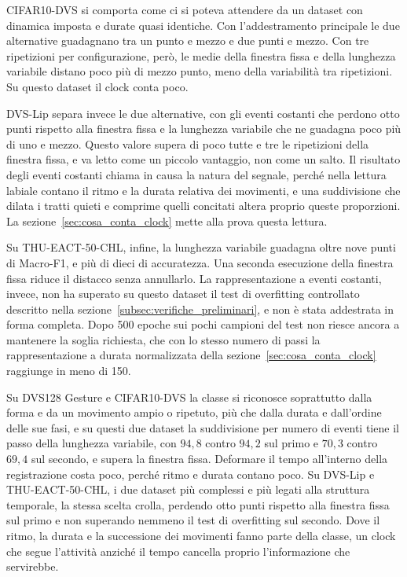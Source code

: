 CIFAR10-DVS si comporta come ci si poteva attendere da un dataset con dinamica imposta e durate quasi identiche. Con l'addestramento principale le due alternative guadagnano tra un punto e mezzo e due punti e mezzo. Con tre ripetizioni per configurazione, però, le medie della finestra fissa e della lunghezza variabile distano poco più di mezzo punto, meno della variabilità tra ripetizioni. Su questo dataset il clock conta poco.

DVS-Lip separa invece le due alternative, con gli eventi costanti che perdono otto punti rispetto alla finestra fissa e la lunghezza variabile che ne guadagna poco più di uno e mezzo. Questo valore supera di poco tutte e tre le ripetizioni della finestra fissa, e va letto come un piccolo vantaggio, non come un salto. Il risultato degli eventi costanti chiama in causa la natura del segnale, perché nella lettura labiale contano il ritmo e la durata relativa dei movimenti, e una suddivisione che dilata i tratti quieti e comprime quelli concitati altera proprio queste proporzioni. La sezione~\ref{sec:cosa_conta_clock} mette alla prova questa lettura.

Su THU-EACT-50-CHL, infine, la lunghezza variabile guadagna oltre nove punti di Macro-F1, e più di dieci di accuratezza. Una seconda esecuzione della finestra fissa riduce il distacco senza annullarlo. La rappresentazione a eventi costanti, invece, non ha superato su questo dataset il test di overfitting controllato descritto nella sezione~\ref{subsec:verifiche_preliminari}, e non è stata addestrata in forma completa. Dopo 500 epoche sui pochi campioni del test non riesce ancora a mantenere la soglia richiesta, che con lo stesso numero di passi la rappresentazione a durata normalizzata della sezione~\ref{sec:cosa_conta_clock} raggiunge in meno di 150.

Su DVS128 Gesture e CIFAR10-DVS la classe si riconosce soprattutto dalla forma e da un movimento ampio o ripetuto, più che dalla durata e dall'ordine delle sue fasi, e su questi due dataset la suddivisione per numero di eventi tiene il passo della lunghezza variabile, con $94{,}8$ contro $94{,}2$ sul primo e $70{,}3$ contro $69{,}4$ sul secondo, e supera la finestra fissa. Deformare il tempo all'interno della registrazione costa poco, perché ritmo e durata contano poco. Su DVS-Lip e THU-EACT-50-CHL, i due dataset più complessi e più legati alla struttura temporale, la stessa scelta crolla, perdendo otto punti rispetto alla finestra fissa sul primo e non superando nemmeno il test di overfitting sul secondo. Dove il ritmo, la durata e la successione dei movimenti fanno parte della classe, un clock che segue l'attività anziché il tempo cancella proprio l'informazione che servirebbe.

